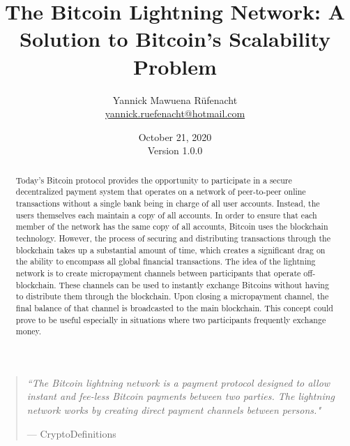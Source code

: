 \documentclass[a4paper, 12pt]{report}
\newcommand{\hsp}{\hspace{20pt}}
\begin{document}
\title{\LARGE{The Bitcoin Lightning Network: A Solution to Bitcoin's Scalability Problem}}
\author{Yannick Mawuena Rüfenacht \\ \href{mailto:yannick.ruefenacht@hotmail.com}{yannick.ruefenacht@hotmail.com}}
\date{October 21, 2020\\Version 1.0.0}
\maketitle

\begin{quote}
\vspace*{\fill}
\textit{``The Bitcoin lightning network is a payment protocol designed to allow instant and fee-less Bitcoin payments between two parties. The lightning network works by creating direct payment channels between persons."}
\par\raggedleft--- \textup{CryptoDefinitions}
\vspace*{\fill}
\end{quote}

\begin{abstract}
Today’s Bitcoin protocol provides the opportunity to participate in a secure decentralized payment system that operates on a network of peer-to-peer online transactions without a single bank being in charge of all user accounts. Instead, the users themselves each maintain a copy of all accounts. In order to ensure that each member of the network has the same copy of all accounts, Bitcoin uses the blockchain technology. However, the process of securing and distributing transactions through the blockchain takes up a substantial amount of time, which creates a significant drag on the ability to encompass all global financial transactions. The idea of the lightning network is to create micropayment channels between participants that operate off-blockchain. These channels can be used to instantly exchange Bitcoins without having to distribute them through the blockchain. Upon closing a micropayment channel, the final balance of that channel is broadcasted to the main blockchain. This concept could prove to be useful especially in situations where two participants frequently exchange money.
\end{abstract}

\tableofcontents
\listoffigures

\setlength{\parskip}{1em}
\setlength{\parindent}{0em}
\titleformat{\chapter}[hang]{\LARGE\bfseries}{\thechapter\hsp\textcolor{gray75}{|}\hsp}{0pt}{\LARGE\bfseries}
\titleformat{\section}[hang]{\large\bfseries}{\thesection\hsp\textcolor{gray75}{|}\hsp}{0pt}{\large\bfseries}
\end{document}
